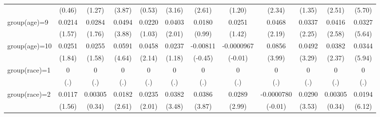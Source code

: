 \begin{table}[htbp]
\begin{tabular}{l*{11}{c}}
                    &      (0.46)         &      (1.27)         &      (3.87)         &      (0.53)         &      (3.16)         &      (2.61)         &      (1.20)         &      (2.34)         &      (1.35)         &      (2.51)         &      (5.70)         \\
[1em]
group(age)=9        &      0.0214         &      0.0284         &      0.0494\sym{***}&      0.0220         &      0.0403         &      0.0180         &      0.0251         &      0.0468\sym{*}  &      0.0337\sym{*}  &      0.0416\sym{*}  &      0.0327\sym{***}\\
                    &      (1.57)         &      (1.76)         &      (3.88)         &      (1.03)         &      (2.01)         &      (0.99)         &      (1.42)         &      (2.19)         &      (2.25)         &      (2.58)         &      (5.64)         \\
[1em]
group(age)=10       &      0.0251         &      0.0255         &      0.0591\sym{***}&      0.0458\sym{*}  &      0.0237         &    -0.00811         &  -0.0000967         &      0.0856\sym{***}&      0.0492\sym{**} &      0.0382\sym{*}  &      0.0344\sym{***}\\
                    &      (1.84)         &      (1.58)         &      (4.64)         &      (2.14)         &      (1.18)         &     (-0.45)         &     (-0.01)         &      (3.99)         &      (3.29)         &      (2.37)         &      (5.94)         \\
[1em]
group(race)=1       &           0         &           0         &           0         &           0         &           0         &           0         &           0         &           0         &           0         &           0         &           0         \\
                    &         (.)         &         (.)         &         (.)         &         (.)         &         (.)         &         (.)         &         (.)         &         (.)         &         (.)         &         (.)         &         (.)         \\
[1em]
group(race)=2       &      0.0117         &     0.00305         &      0.0182\sym{*}  &      0.0235         &      0.0382\sym{**} &      0.0386\sym{***}&      0.0289\sym{**} &  -0.0000780         &      0.0290\sym{***}&     0.00305         &      0.0194\sym{***}\\
                    &      (1.56)         &      (0.34)         &      (2.61)         &      (2.01)         &      (3.48)         &      (3.87)         &      (2.99)         &     (-0.01)         &      (3.53)         &      (0.34)         &      (6.12)         \\

\end{tabular}
\end{table}
